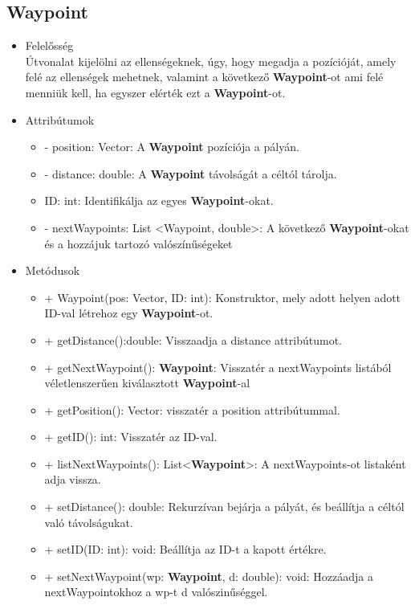 \subsection{Waypoint}
\begin{itemize}
\item Felelősség\\
Útvonalat kijelölni az ellenségeknek, úgy, hogy megadja a pozícióját, amely felé az ellenségek mehetnek, valamint a következő  \textbf{Waypoint}-ot ami felé menniük kell, ha egyszer elérték ezt a  \textbf{Waypoint}-ot.
\item Attribútumok
	\begin{itemize}
		\item - position: Vector: A \textbf{Waypoint} pozíciója a pályán.
		\item - distance: double: A  \textbf{Waypoint} távolságát a céltól tárolja.
		\item ID: int: Identifikálja az egyes \textbf{Waypoint}-okat.
		\item - nextWaypoints: List <Waypoint, double>: A következő  \textbf{Waypoint}-okat és a hozzájuk tartozó valószínűségeket
	\end{itemize}
\item Metódusok
	\begin{itemize}
		\item + Waypoint(pos: Vector, ID: int): Konstruktor, mely adott helyen adott ID-val létrehoz egy \textbf{Waypoint}-ot.
		\item + getDistance():double: Visszaadja a distance attribútumot.
		\item + getNextWaypoint(): \textbf{Waypoint}: Visszatér a nextWaypoints listából véletlenszerűen kiválasztott \textbf{Waypoint}-al
		\item + getPosition(): Vector: visszatér a position attribútummal.
		\item + getID(): int: Visszatér az ID-val.
		\item + listNextWaypoints(): List<\textbf{Waypoint}>: A nextWaypoints-ot listaként adja vissza.
		\item + setDistance(): double: Rekurzívan bejárja a pályát, és beállítja a céltól való távolságukat.
		\item + setID(ID: int): void: Beállítja az ID-t a kapott értékre.
		\item + setNextWaypoint(wp: \textbf{Waypoint}, d: double): void: Hozzáadja a nextWaypointokhoz a wp-t d valószinűséggel.
	\end{itemize}
\end{itemize}

